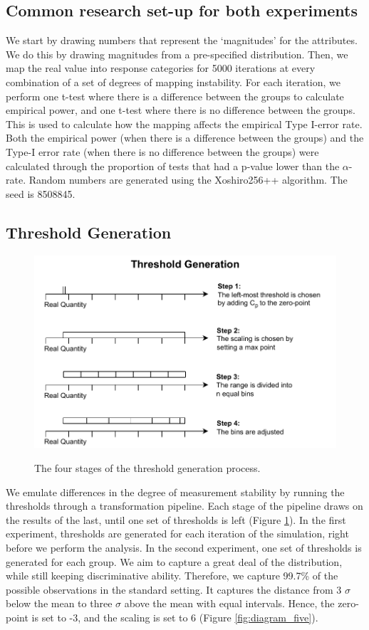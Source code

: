 \documentclass[titlepage, a4paper, 11pt]{article}
\begin{document}
\subsection{Common research set-up for both experiments}
We start by drawing numbers that represent the `magnitudes' for the attributes. We do this by drawing magnitudes from a pre-specified distribution. Then, we map the real value into response categories for 5000 iterations at every combination of a set of degrees of mapping instability. For each iteration, we perform one t-test where there is a difference between the groups to calculate empirical power, and one t-test where there is no difference between the groups. This is used to calculate how the mapping affects the empirical Type I-error rate. Both the empirical power (when there is a difference between the groups) and the Type-I error rate (when there is no difference between the groups) were calculated through the proportion of tests that had a p-value lower than the $\alpha$-rate. Random numbers are generated using the Xoshiro256++ algorithm. The seed is 8508845.
\subsection{Threshold Generation}

\begin{figure}
    \centering
    \includegraphics[width=0.5\linewidth]{Plots/threshold_generation.pdf}
    \label{fig:diagram_four}
    \caption{The four stages of the threshold generation process.}
\end{figure}

We emulate differences in the degree of measurement stability by running the thresholds through a transformation pipeline. Each stage of the pipeline draws on the results of the last, until one set of thresholds is left (Figure \ref{fig:diagram_four}). In the first experiment, thresholds are generated for each iteration of the simulation, right before we perform the analysis. In the second experiment, one set of thresholds is generated for each group. We aim to capture a great deal of the distribution, while still keeping discriminative ability. Therefore, we capture 99.7\% of the possible observations in the  standard setting. It captures the distance from 3 $\sigma$ below the mean to three $\sigma$ above the mean with equal intervals. Hence, the zero-point is set to -3, and the scaling is set to 6 (Figure \ref{fig:diagram_five}).
\end{document}
